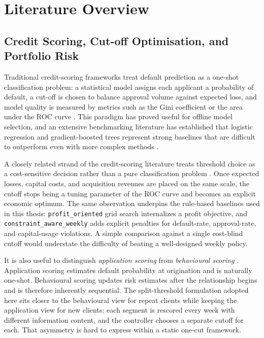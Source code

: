 \documentclass[12pt,a4paper]{article}
\begin{document}
\section{Literature Overview}

\subsection{Credit Scoring, Cut-off Optimisation, and Portfolio Risk}

Traditional credit-scoring frameworks treat default prediction as a one-shot classification problem: a statistical model assigns each applicant a probability of default, a cut-off is chosen to balance approval volume against expected loss, and model quality is measured by metrics such as the Gini coefficient or the area under the ROC curve \cite{thomas2017, hand1997, siddiqi2006}. This paradigm has proved useful for offline model selection, and an extensive benchmarking literature has established that logistic regression and gradient-boosted trees represent strong baselines that are difficult to outperform even with more complex methods \cite{lessmann2015, baesens2003}.

A closely related strand of the credit-scoring literature treats threshold choice as a cost-sensitive decision rather than a pure classification problem \cite{baesens2003, lessmann2015}. Once expected losses, capital costs, and acquisition revenues are placed on the same scale, the cutoff stops being a tuning parameter of the ROC curve and becomes an explicit economic optimum. The same observation underpins the rule-based baselines used in this thesis: \texttt{profit\_oriented} grid search internalizes a profit objective, and \texttt{constraint\_aware\_weekly} adds explicit penalties for default-rate, approval-rate, and capital-usage violations. A simple comparison against a single cost-blind cutoff would understate the difficulty of beating a well-designed weekly policy.

It is also useful to distinguish \emph{application scoring} from \emph{behavioural scoring} \cite{thomas2017, siddiqi2006}. Application scoring estimates default probability at origination and is naturally one-shot. Behavioural scoring updates risk estimates after the relationship begins and is therefore inherently sequential. The split-threshold formulation adopted here sits closer to the behavioural view for repeat clients while keeping the application view for new clients: each segment is rescored every week with different information content, and the controller chooses a separate cutoff for each. That asymmetry is hard to express within a static one-cut framework.
\end{document}
